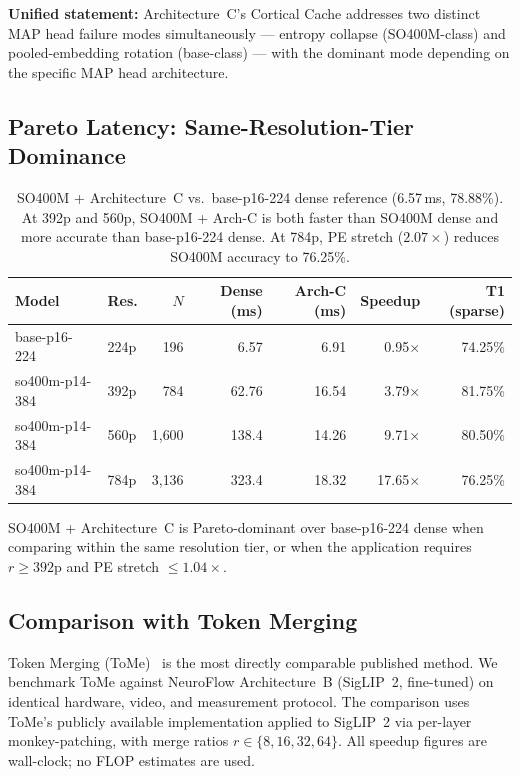 \documentclass{article}
\begin{document}
\textbf{Unified statement:} Architecture~C's Cortical Cache addresses
two distinct MAP head failure modes simultaneously — entropy collapse
(SO400M-class) and pooled-embedding rotation (base-class) — with the
dominant mode depending on the specific MAP head architecture.

\subsection{Pareto Latency: Same-Resolution-Tier Dominance}
\label{sec:pareto-latency}

\begin{table}[htbp]
\centering
\setlength{\tabcolsep}{4pt}
\renewcommand{\arraystretch}{1.12}
\begin{tabular}{llrrrrr}
\toprule
\textbf{Model} & \textbf{Res.} & \textbf{$N$}
  & \textbf{Dense (ms)} & \textbf{Arch-C (ms)} & \textbf{Speedup}
  & \textbf{T1 (sparse)} \\
\midrule
base-p16-224   & 224p &     196 &  6.57 &  6.91 & 0.95$\times$ & 74.25\% \\
so400m-p14-384 & 392p &     784 & 62.76 & 16.54 & 3.79$\times$ & 81.75\% \\
so400m-p14-384 & 560p & 1{,}600 & 138.4 & 14.26 & 9.71$\times$ & 80.50\% \\
so400m-p14-384 & 784p & 3{,}136 & 323.4 & 18.32 & 17.65$\times$ & 76.25\% \\
\bottomrule
\end{tabular}
\caption{SO400M + Architecture~C vs.\ base-p16-224 dense reference
(6.57\,ms, 78.88\%). At 392p and 560p, SO400M + Arch-C is both faster
than SO400M dense and more accurate than base-p16-224 dense. At 784p,
PE stretch ($2.07\times$) reduces SO400M accuracy to 76.25\%.}
\label{tab:pareto-latency}
\end{table}

SO400M + Architecture~C is Pareto-dominant over base-p16-224 dense when
comparing within the same resolution tier, or when the application
requires $r \geq 392$p and PE stretch $\leq 1.04\times$.

\subsection{Comparison with Token Merging}
\label{sec:comparison_tome}


Token Merging (ToMe)~\cite{bolya2023tokenmergingvitfaster} is the most
directly comparable published method. We benchmark ToMe against
NeuroFlow Architecture~B (SigLIP~2, fine-tuned) on identical hardware,
video, and measurement protocol. The comparison uses ToMe's publicly
available implementation applied to SigLIP~2 via per-layer monkey-patching,
with merge ratios $r \in \{8, 16, 32, 64\}$. All speedup figures are
wall-clock; no FLOP estimates are used.
\end{document}
